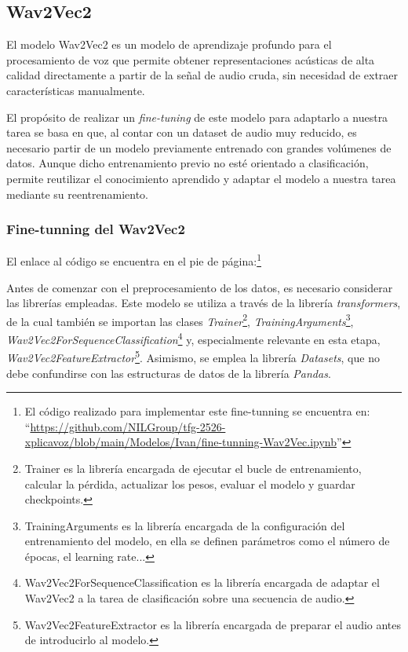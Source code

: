 \subsection{Wav2Vec2}

El modelo Wav2Vec2 es un modelo de aprendizaje profundo para el procesamiento de voz que permite obtener representaciones acústicas de alta calidad directamente a partir de la señal de audio cruda, sin necesidad de extraer características manualmente.

El propósito de realizar un \textit{fine-tuning} de este modelo para adaptarlo a nuestra tarea se basa en que, al contar con un dataset de audio muy reducido, es necesario partir de un modelo previamente entrenado con grandes volúmenes de datos. Aunque dicho entrenamiento previo no esté orientado a clasificación, permite reutilizar el conocimiento aprendido y adaptar el modelo a nuestra tarea mediante su reentrenamiento.

\subsubsection*{Fine-tunning del Wav2Vec2}

El enlace al código se encuentra en el pie de página:\footnote{El código realizado para implementar este fine-tunning se encuentra en: ``\href{https://github.com/NILGroup/tfg-2526-xplicavoz/blob/main/Modelos/Ivan/fine-tunning-Wav2Vec.ipynb}{https://github.com/NILGroup/tfg-2526-xplicavoz/blob/main/Modelos/Ivan/fine-tunning-Wav2Vec.ipynb}''}

Antes de comenzar con el preprocesamiento de los datos, es necesario considerar las librerías empleadas. Este modelo se utiliza a través de la librería \textit{transformers}, de la cual también se importan las clases \textit{Trainer}\footnote{Trainer es la librería encargada de ejecutar el bucle de entrenamiento, calcular la pérdida, actualizar los pesos, evaluar el modelo y guardar checkpoints.}, \textit{TrainingArguments}\footnote{TrainingArguments es la librería encargada de la configuración del entrenamiento del modelo, en ella se definen parámetros como el número de épocas, el learning rate...}, \textit{Wav2Vec2ForSequenceClassification}\footnote{Wav2Vec2ForSequenceClassification es la librería encargada de adaptar el Wav2Vec2 a la tarea de clasificación sobre una secuencia de audio.} y, especialmente relevante en esta etapa, \textit{Wav2Vec2FeatureExtractor}\footnote{Wav2Vec2FeatureExtractor es la librería encargada de preparar el audio antes de introducirlo al modelo.}. Asimismo, se emplea la librería \textit{Datasets}, que no debe confundirse con las estructuras de datos de la librería \textit{Pandas}.

